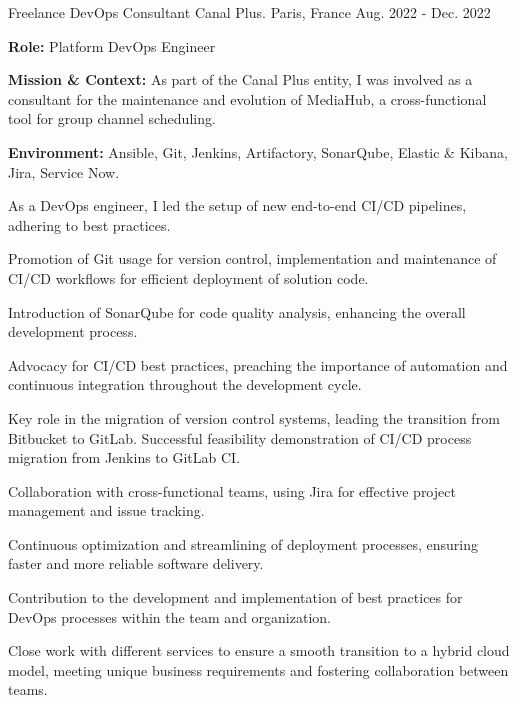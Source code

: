 \begin{cventries}
\cventry
{Freelance DevOps Consultant} %
{Canal Plus.} %
{Paris, France} %
{Aug. 2022 - Dec. 2022} %
{
  \begin{cvitems} %
    \item {\textbf{Role:} Platform DevOps Engineer}
    \item {\textbf{Mission \& Context:} As part of the Canal Plus entity, I was involved as a consultant for the maintenance and evolution of MediaHub, a cross-functional tool for group channel scheduling.}
    \item {\textbf{Environment:} Ansible, Git, Jenkins, Artifactory, SonarQube, Elastic \& Kibana, Jira, Service Now.}
    \item {As a DevOps engineer, I led the setup of new end-to-end CI/CD pipelines, adhering to best practices.}
    \item {Promotion of Git usage for version control, implementation and maintenance of CI/CD workflows for efficient deployment of solution code.}
    \item {Introduction of SonarQube for code quality analysis, enhancing the overall development process.}
    \item {Advocacy for CI/CD best practices, preaching the importance of automation and continuous integration throughout the development cycle.}
    \item {Key role in the migration of version control systems, leading the transition from Bitbucket to GitLab. Successful feasibility demonstration of CI/CD process migration from Jenkins to GitLab CI.}
    \item {Collaboration with cross-functional teams, using Jira for effective project management and issue tracking.}
    \item {Continuous optimization and streamlining of deployment processes, ensuring faster and more reliable software delivery.}
    \item {Contribution to the development and implementation of best practices for DevOps processes within the team and organization.}
    \item {Close work with different services to ensure a smooth transition to a hybrid cloud model, meeting unique business requirements and fostering collaboration between teams.}
  \end{cvitems}        
}


\end{cventries}
